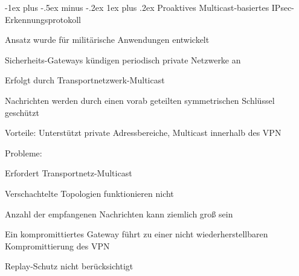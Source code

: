 \documentclass[a4paper]{article}
\makeatletter
\renewcommand{\subsubsection}{\@startsection{subsubsection}{3}{0mm}%
 {-1ex plus -.5ex minus -.2ex}%
 {1ex plus .2ex}%
 {\normalfont\small\bfseries}}
\makeatother
\begin{document}
\begin{multicols}{3}
      \subsubsection{Proaktives Multicast-basiertes IPsec-Erkennungsprotokoll}
      \begin{itemize*}
            \item Ansatz wurde für militärische Anwendungen entwickelt
            \item Sicherheits-Gateways kündigen periodisch private Netzwerke an
            \item Erfolgt durch Transportnetzwerk-Multicast
            \item Nachrichten werden durch einen vorab geteilten symmetrischen Schlüssel geschützt
            \item Vorteile: Unterstützt private Adressbereiche, Multicast innerhalb des VPN
            \item Probleme:
            \begin{itemize*}
                  \item Erfordert Transportnetz-Multicast
                  \item Verschachtelte Topologien funktionieren nicht
                  \item Anzahl der empfangenen Nachrichten kann ziemlich groß sein
                  \item Ein kompromittiertes Gateway führt zu einer nicht wiederherstellbaren Kompromittierung des VPN
                  \item Replay-Schutz nicht berücksichtigt
            \end{itemize*}
      \end{itemize*}


\end{multicols}
\end{document}
